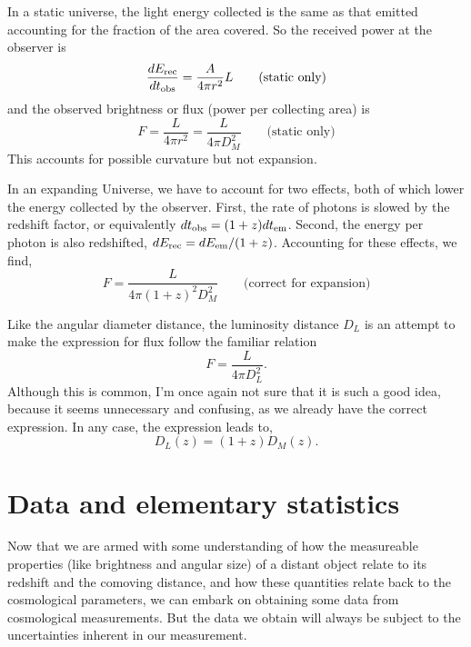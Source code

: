 In a static universe, the light energy collected is the same as that emitted accounting for the fraction of the area covered. So the received power at the observer is
\begin{equation}
  \frac{dE_{\rm rec}}{dt_{\rm obs}} = \frac{A}{4\pi r^2}L   \qquad \mbox{(static only)}
\end{equation}
and the observed brightness or flux (power per collecting area) is
\begin{equation}
  F = \frac{L}{4\pi r^2} =  \frac{L}{4\pi D_M^2}  \qquad \mbox{(static only)}
\end{equation}
This accounts for possible curvature but not expansion.

In an expanding Universe, we have to account for two effects, both of which lower the energy collected by the observer.  First, the rate of photons is slowed by the redshift factor, or equivalently $dt_{\rm obs} = (1+z) dt_{\rm em}$.  Second, the energy per photon is also redshifted, $dE_{\rm rec} = dE_{\rm em}/(1+z)$.  Accounting for these effects, we find,
\begin{equation}
    F = \frac{L}{4\pi (1+z)^2 D_M^2}  \qquad \mbox{(correct for expansion)}
\end{equation}

Like the angular diameter distance, the luminosity distance $D_L$ is an attempt to make the expression for flux follow the familiar relation
\begin{equation}
    F = \frac{L}{4\pi D_L^2}.
\end{equation}
Although this is common, I'm once again not sure that it is such a good idea, because it seems unnecessary and confusing, as we already have the correct expression.  In any case, the expression leads to,
\begin{equation}
  D_L(z) = (1+z) D_M(z).
\end{equation}

\section{Data and elementary statistics}
Now that we are armed with some understanding of how the measureable properties (like brightness and angular size) of a distant object relate to its redshift and the comoving distance, and how these quantities relate back to the cosmological parameters, we can embark on obtaining some data from cosmological measurements.  But the data we obtain will always be subject to the uncertainties inherent in our measurement.

